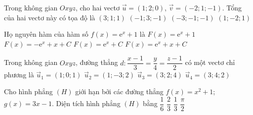 \begin{ex}%
	Trong không gian $Oxyz$, cho hai vectơ $\overrightarrow{u}=(1;2;0)$, $\overrightarrow{v}=(-2;1;-1)$. Tổng của hai vectơ này có tọa độ là
	\choice
	{$(3;1;1)$}
	{\True $(-1;3;-1)$}
	{$(-3;-1;-1)$}
	{$(1;-2;1)$}
\end{ex}

\begin{ex}%
	Họ nguyên hàm của hàm số $f(x)=\mathrm{e}^x+1$ là
	\choice
	{$F(x)=\mathrm{e}^x+1$}
	{$F(x)=-\mathrm{e}^x+x+C$}
	{$F(x)=\mathrm{e}^x+C$}
	{\True $F(x)=\mathrm{e}^x+x+C$}
\end{ex}

\begin{ex}%
	Trong không gian $Oxyz$, đường thẳng $d\colon \dfrac{x-1}{3}=\dfrac{y}{4}=\dfrac{z-1}{2}$ có một vectơ chỉ phương là
	\choice
	{$\overrightarrow{u}_1=(1;0;1)$}
	{$\overrightarrow{u}_2=(1;-3;2)$}
	{$\overrightarrow{u}_3=(3;2;4)$}
	{\True $\overrightarrow{u}_4=(3;4;2)$}
\end{ex}

\begin{ex}%
	Cho hình phẳng $(H)$ giới hạn bởi các đường thẳng $f(x)=x^2+1$; $g(x)=3x-1$. Diện tích hình phẳng $(H)$ bằng
	\choice
	{\True $\dfrac{1}{6}$}
	{$\dfrac{2}{3}$}
	{$\dfrac{1}{3}$}
	{$\dfrac{\pi}{2}$}
\end{ex}

